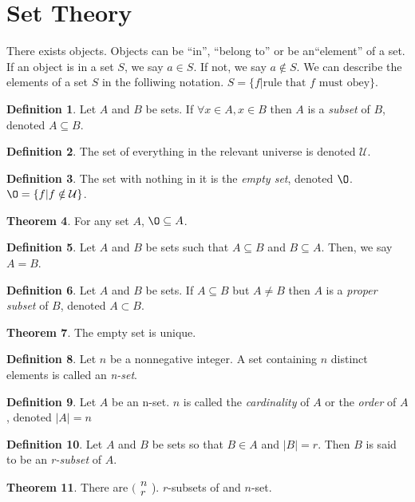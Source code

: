 \documentclass[11pt]{article}
\theoremstyle{definition}
\newtheorem{theorem}{Theorem}[section]
\newtheorem{definition}[theorem]{Definition}
\begin{document}
\section{Set Theory}
There exists objects. Objects can be ``in'', ``belong to'' or be an``element'' of a set. If an object is in a set $S$, we say $a \in S$. If not, we say $a \notin S$. We can describe the elements of a set $S$ in the folliwing notation. $S = \{f \vert \text{rule that $f$ must obey} \}$.
\begin{definition}
    Let $A$ and $B$ be sets. If $\forall x \in A, x \in B$ then $A$ is a \emph{subset} of $B$, denoted $A \subseteq B$.
\end{definition}
\begin{definition}
    The set of everything in the relevant universe is denoted $\mathcal{U}$.
\end{definition}
\begin{definition}
    The set with nothing in it is the \emph{empty set}, denoted $\O$. $\O = \{ f \vert f \notin \mathcal{U} \}$.
\end{definition}
\begin{theorem}
For any set $A$, $\O \subseteq A$.
\end{theorem}
\begin{definition}
Let $A$ and $B$ be sets such that $A \subseteq B$ and $B \subseteq A$. Then, we say $A=B$.
\end{definition}
\begin{definition}
Let $A$ and $B$ be sets. If $A \subseteq B$ but $A \neq B$ then $A$ is a \emph{proper subset} of $B$, denoted $A \subset B$.
\end{definition}
\begin{theorem}
The empty set is unique.
\end{theorem}
\begin{definition}
    Let $n$ be a nonnegative integer. A set containing $n$ distinct elements is called an \emph{n-set}.
\end{definition}
\begin{definition}
    Let $A$ be an n-set. $n$ is called the \emph{cardinality} of $A$ or the \emph{order} of $A$, denoted $\vert A \vert = n$
\end{definition}
\begin{definition}
    Let $A$ and $B$ be sets so that $B \in A$ and $\vert B \vert = r$. Then $B$ is said to be an \emph{r-subset} of $A$.
\end{definition}
\begin{theorem}
    There are $(\begin{smallmatrix} n\\r \end{smallmatrix}$). $r$-subsets of and $n$-set.
\end{theorem}
\end{document}

